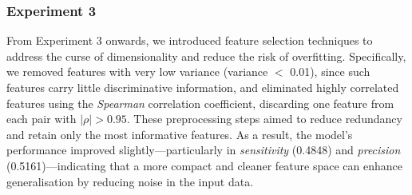 \documentclass[12pt, a4paper]{report}
\begin{document}
\begin{table}[H]
\centering
\renewcommand{\arraystretch}{1.5} %
\normalsize %
\caption{Configuration 2 - Control cases removal}
\end{table}

\subsubsection{Experiment 3}

From Experiment 3 onwards, we introduced feature selection techniques to address the curse of dimensionality and reduce the risk of overfitting. Specifically, we removed features with very low variance (variance $<$ 0.01), since such features carry little discriminative information, and eliminated highly correlated features using the \textit{Spearman} correlation coefficient, discarding one feature from each pair with $|\rho| > 0.95$. These preprocessing steps aimed to reduce redundancy and retain only the most informative features. As a result, the model's performance improved slightly—particularly in \textit{sensitivity} (0.4848) and \textit{precision} (0.5161)—indicating that a more compact and cleaner feature space can enhance generalisation by reducing noise in the input data.

\begin{table}[H]
\centering
\renewcommand{\arraystretch}{1.5} %
\normalsize %
\caption{Configuration 3 - Remove low variance \& correlated features}
\end{table}
\end{document}
